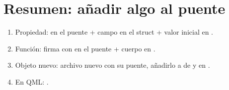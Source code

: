 \section{Resumen: añadir algo al puente}

\begin{enumerate}
  \item Propiedad:  en el puente + campo en el struct + valor
  inicial en .
  \item Función: firma con \cod{#[qinvokable]} en el puente + cuerpo en .
  \item Objeto nuevo: archivo nuevo con su puente, añadirlo a  de
   y  en .
  \item En QML: .
\end{enumerate}
